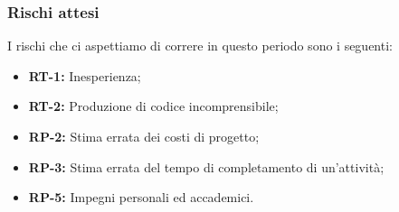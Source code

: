 \documentclass[8pt]{article}
\begin{document}
\subsubsection{Rischi attesi}
I rischi che ci aspettiamo di correre in questo periodo sono i seguenti: 
\begin{itemize}
    \setlength{\itemsep}{0em}
        \item \textbf{RT-1:} Inesperienza;
        \item \textbf{RT-2:} Produzione di codice incomprensibile;
        \item \textbf{RP-2:} Stima errata dei costi di progetto;
        \item \textbf{RP-3:} Stima errata del tempo di completamento di un'attività;
        \item \textbf{RP-5:} Impegni personali ed accademici.
\end{itemize}
\clearpage
\end{document}
